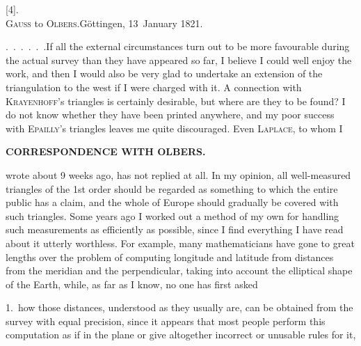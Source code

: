 \begin{center}
[4].\\
\textsc{Gauss} to \textsc{Olbers}.\quad Göttingen, 13~January 1821.
\end{center}

\par\noindent\hspace*{\parindent}.\ .\ .\ .\ .\ .\quad If all the external circumstances turn out to be more favourable during the actual survey than they have appeared so far, I believe I could well enjoy the work, and then I would also be very glad to undertake an extension of the triangulation to the west if I were charged with it.
A connection with \textsc{Krayenhoff}'s triangles is certainly desirable, but where are they to be found?
I do not know whether they have been printed anywhere, and my poor success with \textsc{Epailly}'s triangles leaves me quite discouraged.
Even \textsc{Laplace}, to whom I
\par\clearpage
{}\hfill{\small\textbf{CORRESPONDENCE WITH OLBERS.}}\par\medskip
\noindent wrote about 9 weeks ago, has not replied at all.
In my opinion, all well-measured triangles of the 1st order should be regarded as something to which the entire public has a claim, and the whole of Europe should gradually be covered with such triangles.
Some years ago I worked out a method of my own for handling such measurements as efficiently as possible, since I find everything I have read about it utterly worthless.
For example, many mathematicians have gone to great lengths over the problem of computing longitude and latitude from distances from the meridian and the perpendicular, taking into account the elliptical shape of the Earth, while, as far as I know, no one has first asked

\par\noindent\hspace*{\parindent}1.\ how those distances, understood as they usually are, can be obtained from the survey with equal precision, since it appears that most people perform this computation as if in the plane or give altogether incorrect or unusable rules for it,

